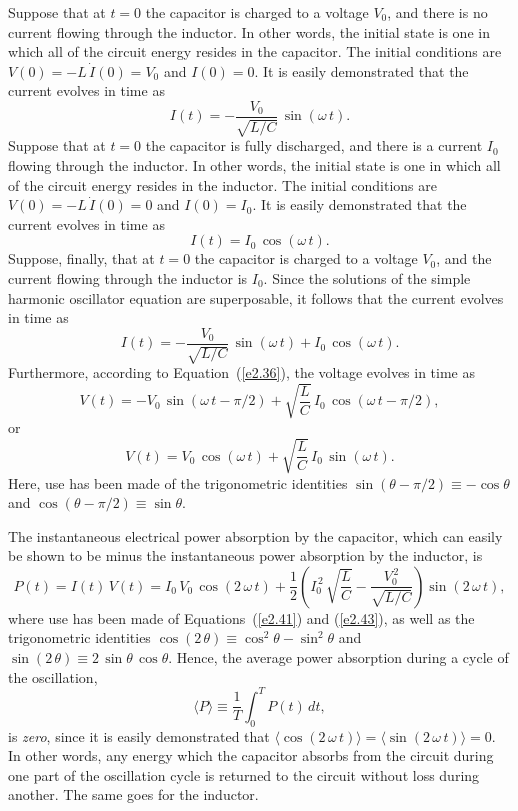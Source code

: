 Suppose that at $t=0$  the capacitor is charged
to a voltage $V_0$, and there is no current flowing through the inductor. In other
words, the initial state is one in which all of the circuit energy resides in the
capacitor. The initial conditions are $V(0)=-L\,\dot{I}(0)=V_0$ and $I(0) = 0$.
It is easily demonstrated that the current evolves in time as
\begin{equation}
I(t) = -\frac{V_0}{\sqrt{L/C}}\,\sin(\omega\,t).
\end{equation}
Suppose that at $t=0$ the capacitor is fully discharged, and there is a current
$I_0$ flowing through the inductor. In other words, the initial state is one in
which all of the circuit energy resides in the inductor. The initial
conditions are $V(0)=-L\,\dot{I}(0)=0$ and $I(0)=I_0$. It is easily demonstrated
that the current evolves in time as
\begin{equation}
I(t) = I_0\,\cos(\omega\,t).
\end{equation}
Suppose, finally, that at $t=0$ the capacitor is charged to a voltage $V_0$,
and the current flowing through the inductor is $I_0$. Since the solutions
of the simple harmonic oscillator equation are superposable, it follows  that the
current evolves in time as
\begin{equation}\label{e2.41}
I(t) =  -\frac{V_0}{\sqrt{L/C}}\,\sin(\omega\,t) +  I_0\,\cos(\omega\,t).
\end{equation}
Furthermore, according to Equation~(\ref{e2.36}),  the voltage evolves in time
as
\begin{equation}
V(t)= - V_0\,\sin(\omega\,t-\pi/2) + \sqrt{\frac{L}{C}}\,I_0\,\cos(\omega\,t-\pi/2),
\end{equation}
or
\begin{equation}\label{e2.43}
V(t) = V_0\,\cos(\omega\,t) + \sqrt{\frac{L}{C}}\,I_0\,\sin(\omega\,t).
\end{equation}
Here, use has been made of the trigonometric identities $\sin (\theta-\pi/2)\equiv -\cos\theta$ and  $\cos(\theta-\pi/2)\equiv \sin\theta$. 

The instantaneous electrical power absorption by the capacitor, which can easily be
shown to be minus the instantaneous power absorption by the inductor,  is
\begin{equation}
P(t)=I(t)\,V(t) = I_0\,V_0\,\cos(2\,\omega\,t) + \frac{1}{2}\left(I_0^{\,2}\,\sqrt{\frac{L}{C}}- \frac{V_0^{\,2}}{\sqrt{L/C}}\right)\sin(2\,\omega\,t),
\end{equation}
where use has been made of Equations~(\ref{e2.41}) and (\ref{e2.43}), as well as the trigonometric identities $\cos(2\,\theta)\equiv \cos^2\theta-\sin^2\theta$ and $\sin(2\,\theta)\equiv 2\,\sin\theta\,\cos\theta$. Hence, the
average power absorption during a cycle of the oscillation,
\begin{equation}
\langle P\rangle \equiv \frac{1}{T}\int_0^T P(t)\,dt,
\end{equation}
is  {\em zero}, since it is easily demonstrated that $\langle\cos(2\,\omega\,t)\rangle=\langle \sin(2\,\omega\,t)\rangle=0$.  In other words, any energy which the capacitor absorbs from the
circuit during one part of the oscillation cycle is returned to the circuit without loss
during another. The same goes for the inductor.

